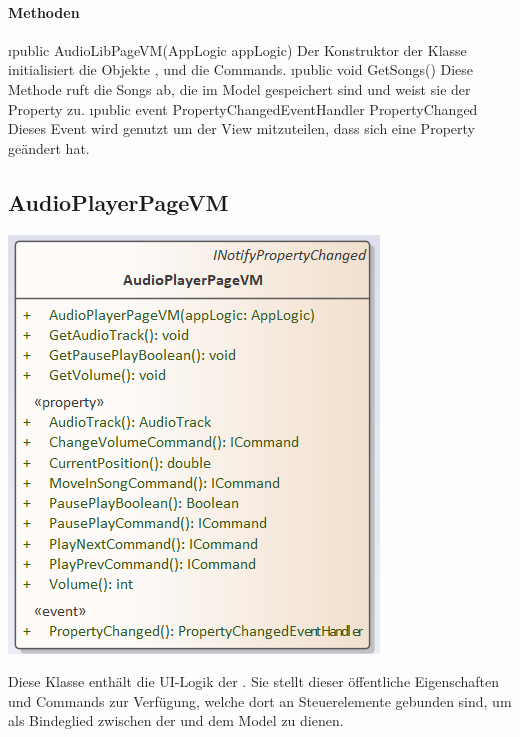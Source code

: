 \documentclass[../entwurf.tex]{subfiles}
\begin{document}
\paragraph{Methoden}
\begin{itemize}
	\i{public AudioLibPageVM(AppLogic appLogic)} Der Konstruktor der Klasse initialisiert die Objekte ,  und die Commands.
	\i{public void GetSongs()} Diese Methode ruft die Songs ab, die im Model gespeichert sind und weist sie der Property  zu.
	\i{public event PropertyChangedEventHandler PropertyChanged} Dieses Event wird genutzt um der View mitzuteilen, dass sich eine Property geändert hat.
\end{itemize}
\subsection{AudioPlayerPageVM}
\begin{minipage}{0.55\textwidth}
\includegraphics[scale=0.75]{../graphics/vm_klassen/AudioPlayerPageVM.png}
\end{minipage}
\begin{minipage}{0.45\textwidth}
Diese Klasse enthält die UI-Logik der . Sie stellt dieser öffentliche Eigenschaften und Commands zur Verfügung, welche dort an Steuerelemente gebunden sind, um als Bindeglied zwischen der  und dem Model zu dienen.
\end{minipage}
\end{document}
